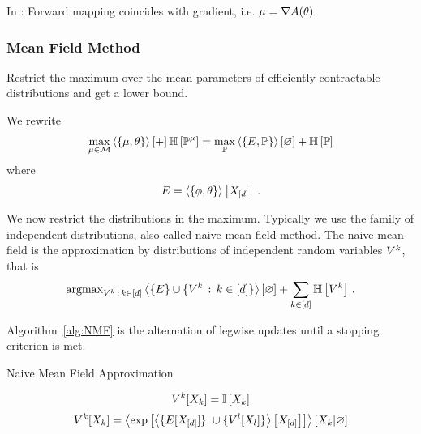 In \cite{wainwright_graphical_2008}: Forward mapping coincides with gradient, i.e. $\mu = \nabla A(\theta)$.


\subsubsection{Mean Field Method}

Restrict the maximum over the mean parameters of efficiently contractable distributions and get a lower bound.

We rewrite 
\begin{align*}
	\max_{\mu\in\mathcal{M}}  \left\langle \left\{\mu, \theta\right\}\right\rangle \left[ + \right] \mathbb{H}\left[\mathbb{P}^{\mu}\right] 
	=
	\max_{\mathbb{P}} \left\langle \left\{E, \mathbb{P}\right\}\right\rangle \left[ \varnothing \right] + \mathbb{H}\left[\mathbb{P}\right]
\end{align*}
where
	\[ E = \left\langle \left\{\phi,\theta\right\}\right\rangle \left[ X_{[d]} \right] \, . \]

We now restrict the distributions in the maximum.
Typically we use the family of independent distributions, also called naive mean field method.
The naive mean field is the approximation by distributions of independent random variables $V^{k}$, that is
\begin{align*}
	\mathrm{argmax}_{V^{k} \, : \, k\in[d]} \left\langle \{E\} \cup \{V^{k} \, : \, k\in[d]\}\right\rangle \left[ \varnothing \right]
	+ \sum_{k\in[d]} \mathbb{H}\left[V^{k}\right] \, . 
\end{align*}

Algorithm~\ref{alg:NMF} is the alternation of legwise updates until a stopping criterion is met.

\begin{algorithm}[h!]
\caption{Naive Mean Field Approximation}\label{alg:NMF}
\begin{algorithmic}
\For{$\catenumeratorin$}
	\State 
		\[ V^{k}[X_{k}] = \mathbb{I}\left[X_{k}\right]  \]
\EndFor
{}
	\For{$\catenumeratorin$}
		\State 
			\[ \legcoreofat{\catenumerator}{\catvariableof{\catenumerator}} 
			= \normationofwrt{ \expof{ \contractionof{ \{\energytensor[\shortcatvariables] \} \cup
				\{\legcoreofat{\secatomenumerator}{\catvariableof{\secatomenumerator}}\} }{\shortcatvariables} }
			}{\catvariableof{\catenumerator}}{\varnothing} \]
\EndFor
\EndWhile
\end{algorithmic}
\end{algorithm}


